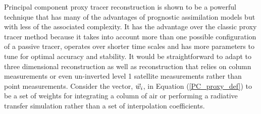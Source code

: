 Principal component proxy tracer reconstruction is shown to be a powerful
technique that 
has many of the advantages of prognostic assimilation models but with
less of the associated complexity.
It has the advantage over the classic proxy tracer method because it takes
into account more than one possible configuration of a passive tracer, operates over
shorter time scales and has more parameters to tune for optimal accuracy
and stability.
It would be straightforward to adapt to three dimensional reconstruction 
as well as reconstruction that relies on column measurements or even un-inverted
level 1 satellite measurements rather than point measurements.
Consider the vector, $\vec w_i$, in Equation (\ref{PC_proxy_def})
to be a set of weights for integrating a column of air or performing
a radiative transfer simulation rather than a set of interpolation
coefficients.

